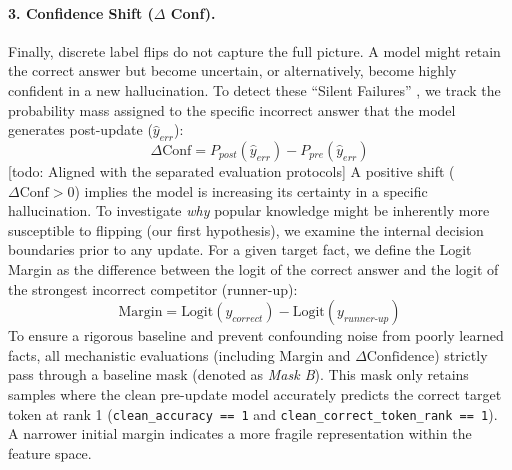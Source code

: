 \paragraph{3. Confidence Shift ($\Delta$ Conf).}
Finally, discrete label flips do not capture the full picture. A model might retain the correct answer but become uncertain, or alternatively, become highly confident in a new hallucination. To detect these ``Silent Failures'' \cite{guo2017calibration}, we track the probability mass assigned to the specific incorrect answer that the model generates post-update ($\hat{y}_{err}$):
\begin{equation}
    \Delta \text{Conf} = P_{post}(\hat{y}_{err}) - P_{pre}(\hat{y}_{err})
    \label{eq:delta_conf}
\end{equation}
[todo: Aligned with the separated evaluation protocols] A positive shift ($\Delta \text{Conf} > 0$) implies the model is increasing its certainty in a specific hallucination.
To investigate \textit{why} popular knowledge might be inherently more susceptible to flipping (our first hypothesis), we examine the internal decision boundaries prior to any update. For a given target fact, we define the Logit Margin as the difference between the logit of the correct answer and the logit of the strongest incorrect competitor (runner-up):
\begin{equation}
    \text{Margin} = \text{Logit}(y_{correct}) - \text{Logit}(y_{runner\text{-}up})
    \label{eq:margin}
\end{equation}
To ensure a rigorous baseline and prevent confounding noise from poorly learned facts, all mechanistic evaluations (including Margin and $\Delta \text{Confidence}$) strictly pass through a baseline mask (denoted as \textit{Mask B}). This mask only retains samples where the clean pre-update model accurately predicts the correct target token at rank 1 (\texttt{clean\_accuracy == 1} and \texttt{clean\_correct\_token\_rank == 1}). A narrower initial margin indicates a more fragile representation within the feature space.

